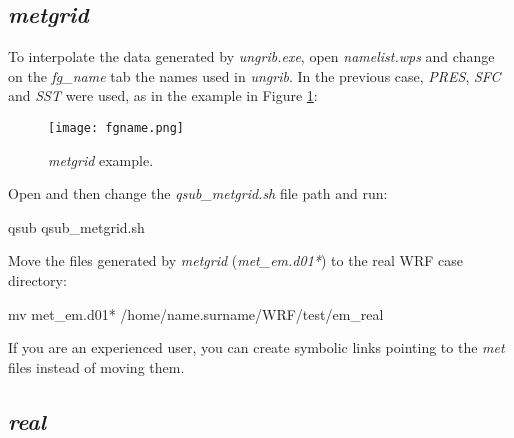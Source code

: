 \subsection{\textit{metgrid}}\label{metgridsecao}
\bigskip
\noindent To interpolate the data generated by \textit{ungrib.exe}, open \textit{namelist.wps} and change on the \textit{fg\_name} tab the 
names used in \textit {ungrib}. In the previous case, \textit {PRES}, \textit{SFC} and \textit{SST} were used, as in the example in 
Figure \textcolor{bleu_cite}{\ref{fgname}}:
\bigskip

\begin{figure}[H]
    \centering
    \texttt{[image: fgname.png]}
    \caption{\textit{metgrid} example.}
    \label{fgname}
\end{figure}
\bigskip

\noindent Open and then change the \textit{qsub\_metgrid.sh} file path and run:
\bigskip

\begin{bashcode}
qsub qsub_metgrid.sh
\end{bashcode}
\bigskip

\noindent Move the files generated by \textit{metgrid} (\textit {met\_em.d01*}) to the real WRF case directory:
\bigskip

\begin{bashcode}
 mv met_em.d01* /home/name.surname/WRF/test/em_real
\end{bashcode}
\bigskip


\begin{tcolorbox}[enhanced,
    grow to left by=0cm,%
    grow to right by=0cm,%
    enlarge top by=0cm,%
    enlarge bottom by=0cm,%
    tcbox raise base,
    boxrule=1.0pt,
    left=18mm,
    colframe=red!50!black,coltext=red!25!black,colback=red!10!white,
    overlay={\begin{tcbclipinterior}\fill[red!75!blue!50!white] (frame.south west)
      rectangle node[text=white,font=\sffamily\bfseries\footnotesize,rotate=0] {WARNING} ([xshift=18mm]frame.north west);\end{tcbclipinterior}}]
If you are an experienced user, you can create symbolic links pointing to the \textit{met} files instead of moving them.
  \end{tcolorbox}
  \bigskip

\subsection{\textit{real}}\label{realsecao}
\bigskip

